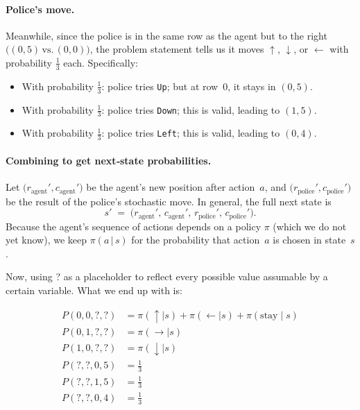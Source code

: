 \begin{enumerate}
    \paragraph{Police's move.}
    Meanwhile, since the police is in the same row as the agent but to the right 
    \(\bigl((0,5)\,\text{vs.}\,(0,0)\bigr)\), 
    the problem statement tells us it moves 
    \(\uparrow\), \(\downarrow\), or \(\leftarrow\) with probability \(\tfrac{1}{3}\) each. 
    Specifically:
    \begin{itemize}
      \item With probability \(\tfrac{1}{3}\): police tries \texttt{Up}; 
            but at row~0, it stays in \((0,5)\).
      \item With probability \(\tfrac{1}{3}\): police tries \texttt{Down}; 
            this is valid, leading to \((1,5)\).
      \item With probability \(\tfrac{1}{3}\): police tries \texttt{Left}; 
            this is valid, leading to \((0,4)\).
    \end{itemize}

    \paragraph{Combining to get next‐state probabilities.}
    Let \(\bigl(r_{\text{agent}}',c_{\text{agent}}'\bigr)\) be the agent’s new position 
    after action~\(a\), 
    and \(\bigl(r_{\text{police}}',c_{\text{police}}'\bigr)\) be the result of the police’s stochastic move.  
    In general, the full next state is 
    \[
      s' \;=\; \bigl(r_{\text{agent}}',\,c_{\text{agent}}',\,r_{\text{police}}',\,c_{\text{police}}'\bigr).
    \]
    Because the agent’s sequence of actions depends on a policy \(\pi\) (which we do not yet know), 
    we keep \(\pi(a\,\lvert\,s)\) for the probability that action~\(a\) is chosen in state~\(s\). 
    
    Now, using ? as a placeholder to reflect every possible value assumable by a certain variable.
    What we end up with is:

    \begin{align*}
      P(0, 0, ?, ?) &= \pi(\uparrow \mid s) + \pi(\leftarrow \mid s) + \pi(\text{stay} \mid s) \\
      P(0, 1, ?, ?) &= \pi(\rightarrow \mid s) \\
      P(1, 0, ?, ?) &= \pi(\downarrow \mid s) \\
      P(?, ?, 0, 5) &= \tfrac{1}{3} \\
      P(?, ?, 1, 5) &= \tfrac{1}{3} \\
      P(?, ?, 0, 4) &= \tfrac{1}{3}
    \end{align*}


\end{enumerate}
